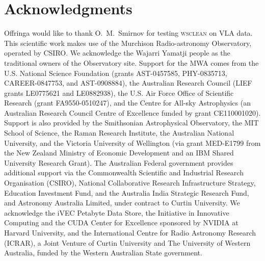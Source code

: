 \documentclass[useAMS,usenatbib]{mn2e}
\DeclareRobustCommand{\TUSSEN}[3]{#2}
\begin{document}
\section*{Acknowledgments}
Offringa would like to thank O.~M.~Smirnov for testing \textsc{wsclean} on VLA data.
This scientific work makes use of the Murchison Radio-astronomy Observatory, operated by CSIRO. We acknowledge the Wajarri Yamatji people as the traditional owners of the Observatory site. Support for the MWA comes from the U.S. National Science Foundation (grants AST-0457585, PHY-0835713, CAREER-0847753, and AST-0908884), the Australian Research Council (LIEF grants LE0775621 and LE0882938), the U.S. Air Force Office of Scientific Research (grant FA9550-0510247), and the Centre for All-sky Astrophysics (an Australian Research Council Centre of Excellence funded by grant CE110001020). Support is also provided by the Smithsonian Astrophysical Observatory, the MIT School of Science, the Raman Research Institute, the Australian National University, and the Victoria University of Wellington (via grant MED-E1799 from the New Zealand Ministry of Economic Development and an IBM Shared University Research Grant). The Australian Federal government provides additional support via the Commonwealth Scientific and Industrial Research Organisation (CSIRO), National Collaborative Research Infrastructure Strategy, Education Investment Fund, and the Australia India Strategic Research Fund, and Astronomy Australia Limited, under contract to Curtin University. We acknowledge the iVEC Petabyte Data Store, the Initiative in Innovative Computing and the CUDA Center for Excellence sponsored by NVIDIA at Harvard University, and the International Centre for Radio Astronomy Research (ICRAR), a Joint Venture of Curtin University and The University of Western Australia, funded by the Western Australian State government. 

\DeclareRobustCommand{\TUSSEN}[3]{#3}




\label{lastpage}
\end{document}
